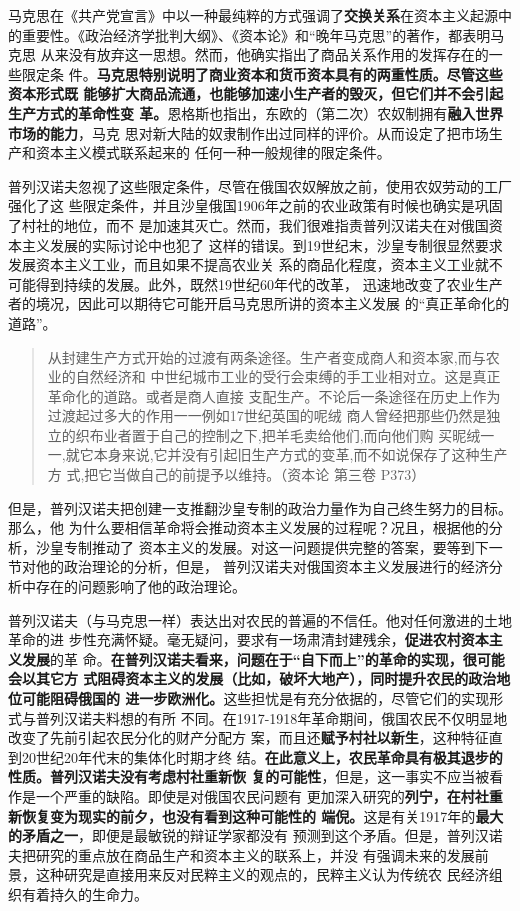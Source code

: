马克思在《共产党宣言》中以一种最纯粹的方式强调了\textbf{交换关系}在资本主义起源中
的重要性。《政治经济学批判大纲》、《资本论》和“晚年马克思”的著作，都表明马克思
从来没有放弃这一思想。然而，他确实指出了商品关系作用的发挥存在的一些限定条
件。\textbf{马克思特别说明了商业资本和货币资本具有的两重性质。尽管这些资本形式既
  能够扩大商品流通，也能够加速小生产者的毁灭，但它们并不会引起生产方式的革命性变
  革。}恩格斯也指出，东欧的（第二次）农奴制拥有\textbf{融入世界市场的能力}，马克
思对新大陆的奴隶制作出过同样的评价。从而设定了把市场生产和资本主义模式联系起来的
任何一种一般规律的限定条件。

普列汉诺夫忽视了这些限定条件，尽管在俄国农奴解放之前，使用农奴劳动的工厂强化了这
些限定条件，并且沙皇俄国1906年之前的农业政策有时候也确实是巩固了村社的地位，而不
是加速其灭亡。然而，我们很难指责普列汉诺夫在对俄国资本主义发展的实际讨论中也犯了
这样的错误。到19世纪末，沙皇专制很显然要求发展资本主义工业，而且如果不提高农业关
系的商品化程度，资本主义工业就不可能得到持续的发展。此外，既然19世纪60年代的改革，
迅速地改变了农业生产者的境况，因此可以期待它可能开启马克思所讲的资本主义发展
的“真正革命化的道路”。
\begin{quotation}
  从封建生产方式开始的过渡有两条途径。生产者变成商人和资本家,而与农业的自然经济和
  中世纪城市工业的受行会束缚的手工业相对立。这是真正革命化的道路。或者是商人直接
  支配生产。不论后一条途径在历史上作为过渡起过多大的作用一一例如17世纪英国的呢绒
  商人曾经把那些仍然是独立的织布业者置于自己的控制之下,把羊毛卖给他们,而向他们购
  买昵绒一一,就它本身来说,它并没有引起旧生产方式的变革,而不如说保存了这种生产方
  式,把它当做自己的前提予以维持。（资本论 第三卷 P373）
\end{quotation}

但是，普列汉诺夫把创建一支推翻沙皇专制的政治力量作为自己终生努力的目标。那么，他
为什么要相信革命将会推动资本主义发展的过程呢？况且，根据他的分析，沙皇专制推动了
资本主义的发展。对这一问题提供完整的答案，要等到下一节对他的政治理论的分析，但是，
普列汉诺夫对俄国资本主义发展进行的经济分析中存在的问题影响了他的政治理论。

普列汉诺夫（与马克思一样）表达出对农民的普遍的不信任。他对任何激进的土地革命的进
步性充满怀疑。毫无疑问，要求有一场肃清封建残余，\textbf{促进农村资本主义发展}的革
命。\textbf{在普列汉诺夫看来，问题在于“自下而上”的革命的实现，很可能会以其它方
  式阻碍资本主义的发展（比如，破坏大地产），同时提升农民的政治地位可能阻碍俄国的
  进一步欧洲化。}这些担忧是有充分依据的，尽管它们的实现形式与普列汉诺夫料想的有所
不同。在1917-1918年革命期间，俄国农民不仅明显地改变了先前引起农民分化的财产分配方
案，而且还\textbf{赋予村社以新生}，这种特征直到20世纪20年代末的集体化时期才终
结。\textbf{在此意义上，农民革命具有极其退步的性质。普列汉诺夫没有考虑村社重新恢
  复的可能性}，但是，这一事实不应当被看作是一个严重的缺陷。即使是对俄国农民问题有
更加深入研究的\textbf{列宁，在村社重新恢复变为现实的前夕，也没有看到这种可能性的
  端倪。}这是有关1917年的\textbf{最大的矛盾之一}，即便是最敏锐的辩证学家都没有
预测到这个矛盾。但是，普列汉诺夫把研究的重点放在商品生产和资本主义的联系上，并没
有强调未来的发展前景，这种研究是直接用来反对民粹主义的观点的，民粹主义认为传统农
民经济组织有着持久的生命力。

